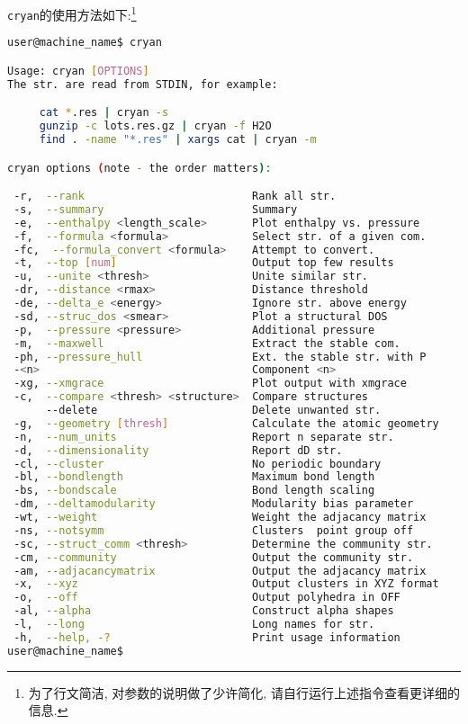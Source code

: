 \documentclass[a4paper, 10pt]{article}
\begin{document}
\verb|cryan|的使用方法如下:\footnote{为了行文简洁, 对参数的说明做了少许简化, 请自行运行上述指令查看更详细的信息.}
\begin{lstlisting}[language={bash}]
user@machine_name$ cryan

Usage: cryan [OPTIONS]
The str. are read from STDIN, for example:

     cat *.res | cryan -s
     gunzip -c lots.res.gz | cryan -f H2O
     find . -name "*.res" | xargs cat | cryan -m

cryan options (note - the order matters):

 -r,  --rank                          Rank all str.
 -s,  --summary                       Summary
 -e,  --enthalpy <length_scale>       Plot enthalpy vs. pressure
 -f,  --formula <formula>             Select str. of a given com.
 -fc,  --formula_convert <formula>    Attempt to convert.
 -t,  --top [num]                     Output top few results
 -u,  --unite <thresh>                Unite similar str.
 -dr, --distance <rmax>               Distance threshold
 -de, --delta_e <energy>              Ignore str. above energy
 -sd, --struc_dos <smear>             Plot a structural DOS
 -p,  --pressure <pressure>           Additional pressure
 -m,  --maxwell                       Extract the stable com.
 -ph, --pressure_hull                 Ext. the stable str. with P
 -<n>                                 Component <n>
 -xg, --xmgrace                       Plot output with xmgrace
 -c,  --compare <thresh> <structure>  Compare structures
      --delete                        Delete unwanted str.
 -g,  --geometry [thresh]             Calculate the atomic geometry
 -n,  --num_units                     Report n separate str.
 -d,  --dimensionality                Report dD str.
 -cl, --cluster                       No periodic boundary
 -bl, --bondlength                    Maximum bond length
 -bs, --bondscale                     Bond length scaling
 -dm, --deltamodularity               Modularity bias parameter
 -wt, --weight                        Weight the adjacancy matrix
 -ns, --notsymm                       Clusters  point group off
 -sc, --struct_comm <thresh>          Determine the community str.
 -cm, --community                     Output the community str.
 -am, --adjacancymatrix               Output the adjacancy matrix
 -x,  --xyz                           Output clusters in XYZ format
 -o,  --off                           Output polyhedra in OFF
 -al, --alpha                         Construct alpha shapes
 -l,  --long                          Long names for str.
 -h,  --help, -?                      Print usage information
user@machine_name$
\end{lstlisting}
\end{document}
